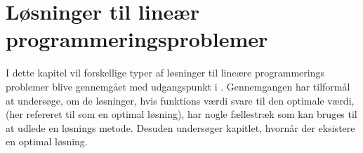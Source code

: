 \chapter{Løsninger til lineær programmeringsproblemer}
I dette kapitel vil forskellige typer af løsninger til lineære programmerings problemer blive gennemgået med udgangspunkt i \citep{bert}.
Gennemgangen har tilformål at undersøge, om de løsninger, hvis funktions værdi svare til den optimale værdi, (her refereret til som en optimal løsning), har nogle fællestræk som kan bruges til at udlede en løsnings metode.
Desuden undersøger kapitlet, hvornår der eksistere en optimal løsning.






